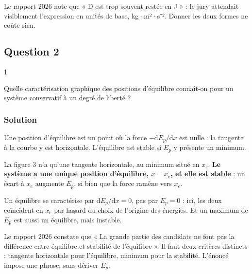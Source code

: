 \documentclass[11pt,a4paper]{article}
\begin{document}
\begin{jury}

Le rapport 2026 note que « D est trop souvent restée en J » : le jury attendait visiblement l'expression en unités de base, kg·m²·s⁻². Donner les deux formes ne coûte rien.

\end{jury}

\hypertarget{question-2}{%
\subsection{Question 2}\label{question-2}}

\begin{indication}{1}

Quelle caractérisation graphique des positions d'équilibre connaît-on pour un système conservatif à un degré de liberté ?

\end{indication}

\hypertarget{solution-1}{%
\subsubsection{Solution}\label{solution-1}}

Une position d'équilibre est un point où la force \(-\mathrm dE_p/\mathrm dx\) est nulle : la tangente à la courbe y est horizontale. L'équilibre est stable si \(E_p\) y présente un minimum.

La figure 3 n'a qu'une tangente horizontale, au minimum situé en \(x_e\). \textbf{Le système a une unique position d'équilibre, \(x=x_e\), et elle est stable} : un écart à \(x_e\) augmente \(E_p\), si bien que la force ramène vers \(x_e\).

\begin{piege}

Un équilibre se caractérise par \(\mathrm dE_p/\mathrm dx=0\), pas par \(E_p=0\) : ici, les deux coïncident en \(x_e\) par hasard du choix de l'origine des énergies. Et un maximum de \(E_p\) est aussi un équilibre, mais instable.

\end{piege}

\begin{jury}

Le rapport 2026 constate que « La grande partie des candidats ne font pas la différence entre équilibre et stabilité de l'équilibre ». Il faut deux critères distincts : tangente horizontale pour l'équilibre, minimum pour la stabilité. L'énoncé impose une phrase, sans dériver \(E_p\).

\end{jury}
\end{document}
